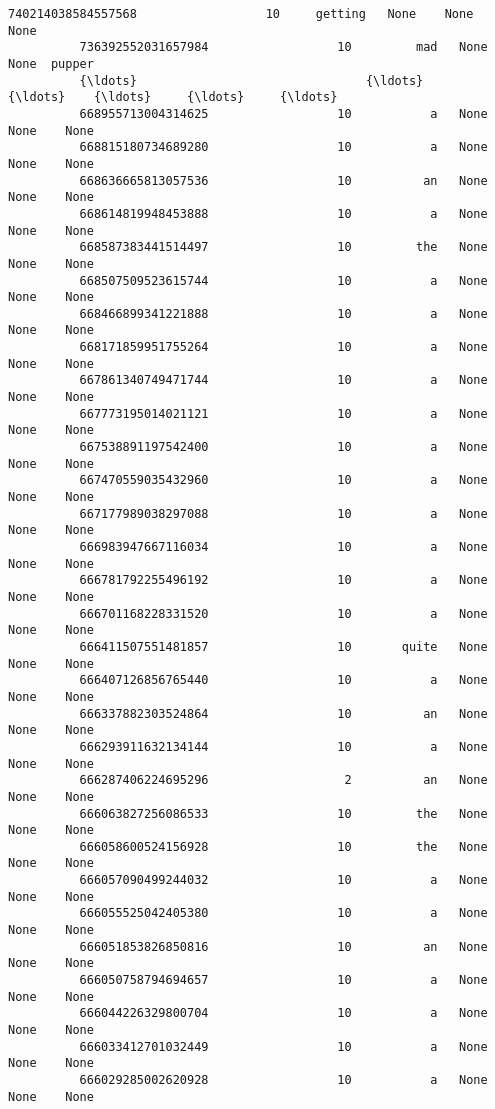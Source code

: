\documentclass[11pt]{article}
\begin{document}
\begin{Verbatim}[commandchars=\\\{\}]
          740214038584557568                  10     getting   None    None    None   
          736392552031657984                  10         mad   None    None  pupper   
          {\ldots}                                {\ldots}         {\ldots}    {\ldots}     {\ldots}     {\ldots}   
          668955713004314625                  10           a   None    None    None   
          668815180734689280                  10           a   None    None    None   
          668636665813057536                  10          an   None    None    None   
          668614819948453888                  10           a   None    None    None   
          668587383441514497                  10         the   None    None    None   
          668507509523615744                  10           a   None    None    None   
          668466899341221888                  10           a   None    None    None   
          668171859951755264                  10           a   None    None    None   
          667861340749471744                  10           a   None    None    None   
          667773195014021121                  10           a   None    None    None   
          667538891197542400                  10           a   None    None    None   
          667470559035432960                  10           a   None    None    None   
          667177989038297088                  10           a   None    None    None   
          666983947667116034                  10           a   None    None    None   
          666781792255496192                  10           a   None    None    None   
          666701168228331520                  10           a   None    None    None   
          666411507551481857                  10       quite   None    None    None   
          666407126856765440                  10           a   None    None    None   
          666337882303524864                  10          an   None    None    None   
          666293911632134144                  10           a   None    None    None   
          666287406224695296                   2          an   None    None    None   
          666063827256086533                  10         the   None    None    None   
          666058600524156928                  10         the   None    None    None   
          666057090499244032                  10           a   None    None    None   
          666055525042405380                  10           a   None    None    None   
          666051853826850816                  10          an   None    None    None   
          666050758794694657                  10           a   None    None    None   
          666044226329800704                  10           a   None    None    None   
          666033412701032449                  10           a   None    None    None   
          666029285002620928                  10           a   None    None    None   
          

\end{Verbatim}
\end{document}
